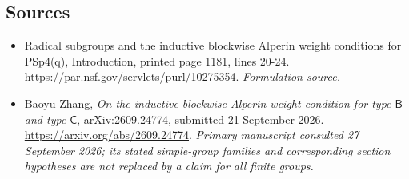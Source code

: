 \documentclass[11pt]{article}
\begin{document}
\subsection{Sources}
\begin{itemize}
\item[S1]Radical subgroups and the inductive blockwise Alperin weight conditions for PSp4(q), Introduction, printed page 1181, lines 20-24.
\url{https://par.nsf.gov/servlets/purl/10275354}.
\textit{Formulation source.}
\item[E1]Baoyu Zhang, \emph{On the inductive blockwise Alperin weight condition for type $\mathsf B$ and type $\mathsf C$}, arXiv:2609.24774, submitted 21 September 2026.
\url{https://arxiv.org/abs/2609.24774}.
\textit{Primary manuscript consulted 27 September 2026; its stated simple-group families and corresponding section hypotheses are not replaced by a claim for all finite groups.}
\end{itemize}
\end{document}
